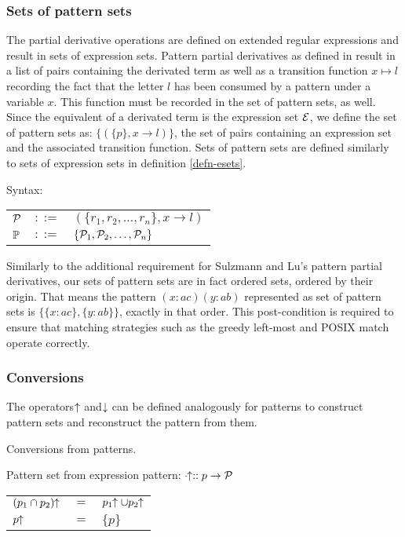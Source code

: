 \subsubsection{Sets of pattern sets}

The partial derivative operations are defined on extended regular expressions
and result in sets of expression sets. Pattern partial derivatives as defined in
\cite{pdpat} result in a list of pairs containing the derivated term as well as
a transition function $x \mapsto l$ recording the fact that the letter $l$ has
been consumed by a pattern under a variable $x$. This function must be recorded
in the set of pattern sets, as well. Since the equivalent of a derivated term is
the expression set $\mathcal{E}$, we define the set of pattern sets as: $\{ (\{ p \},
x \to l) \}$, the set of pairs containing an expression set and the associated
transition function. Sets of pattern sets are defined similarly to sets of
expression sets in definition \ref{defn-esets}.

\needspace{3cm}
\begin{defn}
   \label{defn-psets}
   Syntax:

   \begin{tabular}{lll}
      $\mathcal{P}$	& $::=$ & $(\{r_1, r_2, \dots, r_n\}, x \to l)$ \\
      $\mathbb{P}$	& $::=$ & $\{\mathcal{P}_1, \mathcal{P}_2, \dots, \mathcal{P}_n\}$ \\
   \end{tabular}
\end{defn}

Similarly to the additional requirement for Sulzmann and Lu's pattern partial
derivatives, our sets of pattern sets are in fact ordered sets, ordered by their
origin. That means the pattern $(x:ac)(y:ab)$ represented as set of pattern sets
is $\{\{x:ac\}, \{y:ab\}\}$, exactly in that order. This post-condition is
required to ensure that matching strategies such as the greedy left-most and
POSIX match operate correctly.


\subsubsection{Conversions}

The operators $\!\!\uparrow$ and $\!\!\downarrow$ can be defined analogously for
patterns to construct pattern sets and reconstruct the pattern from them.

\begin{defn}
   \label{defn-re2pset}
   Conversions from patterns.

   Pattern set from expression pattern:
   $\cdot\!\!\uparrow :: p \to \mathcal{P}$

   \begin{tabular}{lll}
      $(p_1 \cap p_2)\!\!\uparrow$	& $=$	& $p_1\!\!\uparrow \cup p_2\!\!\uparrow$	\\
      $p\!\!\uparrow$			& $=$	& $\{p\}$			\\
   \end{tabular}
\end{defn}

